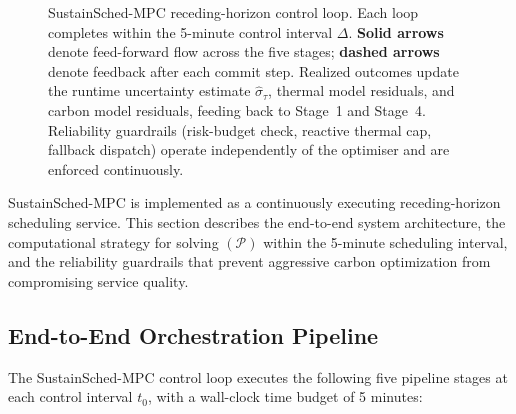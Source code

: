 \documentclass[a4paper,fleqn]{cas-dc}
\begin{document}
\begin{figure}[!t]
{%
}
\caption{SustainSched-MPC receding-horizon control loop. Each loop completes within the 5-minute control interval $\Delta$. \textbf{Solid arrows} denote feed-forward flow across the five stages; \textbf{dashed arrows} denote feedback after each commit step. Realized outcomes update the runtime uncertainty estimate $\hat{\sigma}_\tau$, thermal model residuals, and carbon model residuals, feeding back to Stage~1 and Stage~4. Reliability guardrails (risk-budget check, reactive thermal cap, fallback dispatch) operate independently of the optimiser and are enforced continuously.}
\label{fig:framework_arch}
\end{figure}
\FloatBarrier

SustainSched-MPC is implemented as a continuously executing receding-horizon scheduling service. This section describes the end-to-end system architecture, the computational strategy for solving $(\mathcal{P})$ within the 5-minute scheduling interval, and the reliability guardrails that prevent aggressive carbon optimization from compromising service quality.

\subsection{End-to-End Orchestration Pipeline}
\label{sec:pipeline}

The SustainSched-MPC control loop executes the following five pipeline stages at each control interval $t_0$, with a wall-clock time budget of 5 minutes:
\end{document}
